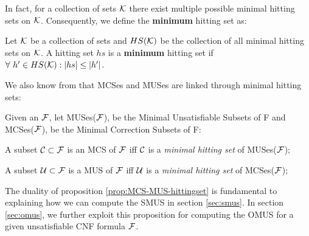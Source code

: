 \noindent In fact, for a collection of sets $\mathcal{K}$ there exist multiple possible minimal hitting sets on $\mathcal{K}$. Consequently, we define the \textbf{minimum} hitting set as:

\begin{definition}\label{def:minimum-hs}
    Let $\mathcal{K}$ be a collection of sets and $HS(\mathcal{K})$ be the collection of all minimal hitting sets on $\mathcal{K}$.
    A hitting set $hs$ is a \textbf{minimum} hitting set if $\forall \ h' \in HS(\mathcal{K}): |hs| \leq |h'|$.
  \end{definition}

  \noindent We also know from \cite{liffiton2008algorithms,reiter1987theory} that MCSes and MUSes are linked through minimal hitting sets:

\begin{proposition}\label{prop:MCS-MUS-hittingset}
    Given an $ \mathcal{F}$, let MUSes($\mathcal{F}$), be the Minimal Unsatisfiable Subsets of F and MCSes($\mathcal{F}$), be the Minimal Correction Subsets of F:
    
    A subset  $\mathcal{C} \subset \mathcal{F}$ is an MCS of $ \mathcal{F}$ iff  $\mathcal{C}$ is a \emph{minimal hitting set} of MUSes($ \mathcal{F}$);

    A subset  $\mathcal{U} \subset \mathcal{F}$ is a MUS of $ \mathcal{F}$ iff  $\mathcal{U}$ is a \emph{minimal hitting set} of MCSes($ \mathcal{F}$);
\end{proposition}

The duality of proposition \ref{prop:MCS-MUS-hittingset} is fundamental to explaining how we can compute the SMUS in section \ref{sec:smus}. 
In section \ref{sec:omus}, we further exploit this proposition for computing the OMUS for a given unsatisfiable CNF formula $\mathcal{F}$.